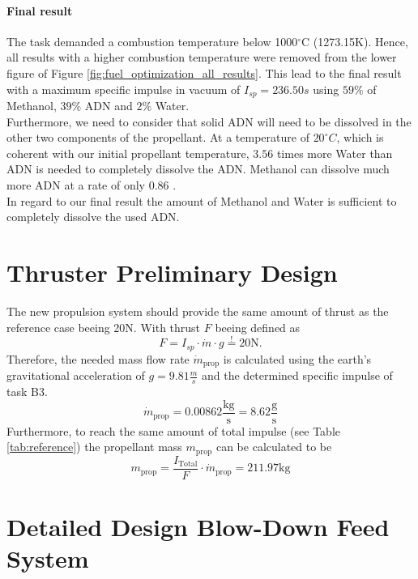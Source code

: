 \documentclass[12pt]{article}
\begin{document}
\paragraph{Final result}
The task demanded a combustion temperature below 1000$^\circ$C (1273.15K). Hence, all results with a higher combustion temperature were removed from the lower figure of Figure \ref{fig:fuel_optimization_all_results}. This lead to the final result with a maximum specific impulse in vacuum of $I_{sp}=236.50s$ using $59\%$ of Methanol, $39\%$ ADN and $2\%$ Water.\\

Furthermore, we need to consider that solid ADN will need to be dissolved in the other two components of the propellant. At a temperature of $20^\circ C$, which is coherent with our initial propellant temperature, $3.56$ times more Water than ADN is needed to completely dissolve the ADN. Methanol can dissolve much more ADN at a rate of only $0.86$ \cite{Larsson2011}.\\

In regard to our final result the amount of Methanol and Water is sufficient to completely dissolve the used ADN.

\section{Thruster Preliminary Design}
The new propulsion system should provide the same amount of thrust as the reference case beeing 20N. With thrust $F$ beeing defined as
\begin{equation*}
	F = I_{sp} \cdot \dot{m} \cdot g \overset{!}{=} 20\text{N}.
\end{equation*}
Therefore, the needed mass flow rate $\dot{m}_{\text{prop}}$ is calculated using the earth's gravitational acceleration of $g=9.81\frac{m}{s}$ and the determined specific impulse of task B3.
\begin{equation*}
	\dot{m}_{\text{prop}} = 0.00862 \frac{\text{kg}}{\text{s}} = 8.62 \frac{\text{g}}{\text{s}}
\end{equation*}
Furthermore, to reach the same amount of total impulse (see Table \ref{tab:reference}) the propellant mass $m_{\text{prop}}$ can be calculated to be
\begin{equation*}
	m_{\text{prop}} = \frac{I_{\text{Total}}}{F} \cdot \dot{m}_{\text{prop}} =  211.97\text{kg}
\end{equation*}



\section{Detailed Design Blow-Down Feed System}
\end{document}
